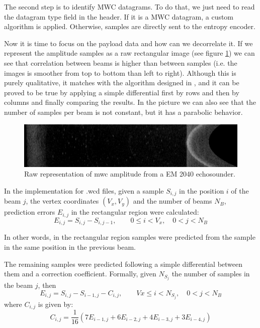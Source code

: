 The second step is to identify MWC datagrams. To do that, we just need to read the datagram type field in the header. If it is a MWC datagram, a custom algorithm is applied. Otherwise, samples are directly sent to the entropy encoder.

Now it is time to focus on the payload data and how can we decorrelate it. If we represent the amplitude samples as a raw rectangular image (see figure \ref{fig:wc_amplitude}) we can see that correlation between beams is higher than between samples (i.e. the images is smoother from top to bottom than left to right). Although this is purely qualitative, it matches with the algorithm designed in \parencite{Portell2019}, and it can be proved to be true by applying a simple differential first by rows and then by columns and finally comparing the results. In the picture we can also see that the number of samples per beam is not constant, but it has a parabolic behavior.
\begin{figure}[h!]
	\begin{center}
		\includegraphics[scale=0.334]{images/water_column_amp.png}
	\end{center}
	\caption{Raw representation of \acrshort{mwc} amplitude from a EM 2040 echosounder.}
	\label{fig:wc_amplitude}
\end{figure}

In the implementation for .wcd files, given a sample $S_{i,j}$ in the position $i$ of the beam $j$, the vertex coordinates $(V_x, V_y)$ and the number of beams $N_B$, prediction errors $E_{i,j}$ in the rectangular region were calculated:
\begin{equation}
E_{i,j} = S_{i,j} - S_{i,j-1}, \qquad 0 \leq i < V_x, \quad 0 < j < N_B
\end{equation}

In other words, in the rectangular region samples were predicted from the sample in the same position in the previous beam.

The remaining samples were predicted following a simple differential between them and a correction coefficient. Formally, given $N_{S_j}$ the number of samples in the beam $j$, then
\begin{equation}
E_{i,j} = S_{i,j} - S_{i-1,j} - C_{i,j}, \qquad Vx \leq i < N_{S_j}, \quad 0 < j < N_B
\end{equation}
where $C_{i,j}$ is given by:
\begin{equation}
C_{i,j} = \frac{1}{16}(7E_{i-1,j} + 6E_{i-2,j} + 4E_{i-3,j} + 3E_{i-4,j})
\end{equation}

